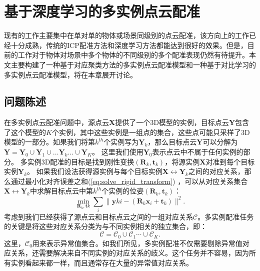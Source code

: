 \chapter{基于深度学习的多实例点云配准}
现有的工作主要集中在单对单的物体或场景同级别的点云配准，该方向上的工作已经十分成熟，传统的ICP配准方法\cite{barath2021progressive, li2020evaluation, shi2020improved}和深度学习方法\cite{qin2022geometric,barath2019progressive,barath2021progressive}都能达到很好的效果。但是，目前的工作对于物体对场景中多个物体的不同级别的多个配准表现仍然有待提升。本文主要构建了一种基于对应聚类方法的多实例点云配准模型和一种基于对比学习的多实例点云配准模型，将在本章展开讨论。
\section{问题陈述}

在多实例点云配准问题中，源点云$\mathbf{X}$提供了一个3D模型的实例，目标点云$\mathbf{Y}$包含了这个模型的$K$个实例，其中这些实例是一组点的集合，这些点可能只采样了3D模型的一部分。如果我们将第$k^{th}$个实例写为$\mathbf{Y}_k$，那么目标点云$\mathbf{Y}$可以分解为$
\mathbf{Y} = \mathbf{Y}_0 \cup \mathbf{Y}_1 \cup \ldots \mathbf{Y}_k \ldots \cup \mathbf{Y}_K$。
这里我们使用$\mathbf{Y}_0$表示点云中不属于任何实例的部分。
多实例3D配准的目标是找到刚性变换$(\mathbf{R}_k, \mathbf{t}_k)$，将源实例$\mathbf{X}$对准到每个目标实例$\mathbf{Y}_k$。
如果我们设法获得源实例与每个目标实例$\mathbf{X} \leftrightarrow \mathbf{Y}_k$之间的对应关系，那么通过最小化对齐误差之和(\ref{eq:solve_rigid_transform}) \cite{levinson2020analysis}，可以从对应关系集合$\mathbf{X}\leftrightarrow \mathbf{Y}_k$中求解目标点云中第$k^{th}$个实例的位姿$(\mathbf{R}_k, \mathbf{t}_k)$：
\begin{equation}
\underset{\mathbf{R}_k,\mathbf{t}k}{\min}\sum_i{\parallel}\mathbf{y}{ki}-(\mathbf{R}_k\mathbf{x}_i+\mathbf{t}_k)\parallel ^2.
\label{eq:solve_rigid_transform}
\end{equation}
考虑到我们已经获得了源点云和目标点云之间的一组对应关系$\mathcal{C}$。多实例配准任务的关键是将这些对应关系分类为与不同实例相关的独立集合，即：
\begin{equation}
\mathcal{C} = \mathcal{C}_0 \cup \mathcal{C}_1\cdots \cup \mathcal{C}_K.
\end{equation}
这里，$\mathcal{C}_0$用来表示异常值集合。如我们所见，多实例配准不仅需要剔除异常值对应关系，还需要解决来自不同实例的对应关系的歧义。这个任务并不容易，因为所有实例看起来都一样，而且通常存在大量的异常值对应关系。

